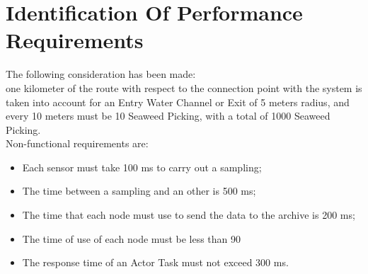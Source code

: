\newpage \chapter{\textbf{Identification Of Performance Requirements}}


The following consideration has been made: \\
one kilometer of the route with respect to the connection point with the system is taken into account for an Entry Water Channel or Exit of 5 meters radius, and every 10 meters must be 10 Seaweed Picking, with a total of 1000 Seaweed Picking. \\
Non-functional requirements are:
\begin{itemize} 
	\item Each sensor must take 100 ms to carry out a sampling;
		\item The time between a sampling and an other is 500 ms;
	\item The time that each node must use to send the data to the 				archive	is 200 ms;
	\item The time of use of each node must be less than 90%
	\item The response time of an Actor Task must not exceed 300 ms.
\end{itemize} 
